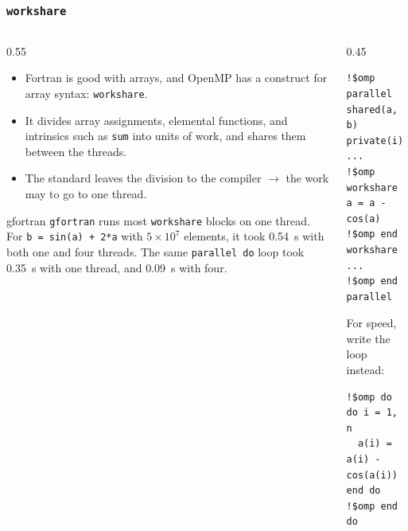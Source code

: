 \begin{frame}[fragile]
  \frametitle{\texttt{workshare}}
  \begin{columns}[T]
    \begin{column}{0.55\textwidth}
      \begin{itemize}
        \item Fortran is good with arrays, and OpenMP has a construct for array syntax: \texttt{workshare}.
        \item It divides array assignments, elemental functions, and intrinsics such as \texttt{sum} into units of work, and shares them between the threads.
        \item The standard leaves the division to the compiler $\rightarrow$ the work may to go to one thread.
      \end{itemize}

      \begin{alertblock}{gfortran}
        \texttt{gfortran} runs most \texttt{workshare} blocks on one thread. For \texttt{b = sin(a) + 2*a} with $5 \times 10^7$ elements, it took 0.54~s with both one and four threads. The same \texttt{parallel do} loop took 0.35~s with one thread, and 0.09~s with four.
      \end{alertblock}
    \end{column}

    \begin{column}{0.45\textwidth}
      \begin{lstlisting}
!$omp parallel shared(a, b) private(i)
...
!$omp workshare
a = a - cos(a)
!$omp end workshare
...
!$omp end parallel
      \end{lstlisting}

      \vspace*{2mm}
      For speed, write the loop instead:
      \begin{lstlisting}
!$omp do
do i = 1, n
  a(i) = a(i) - cos(a(i))
end do
!$omp end do
      \end{lstlisting}
    \end{column}
  \end{columns}
\end{frame}


